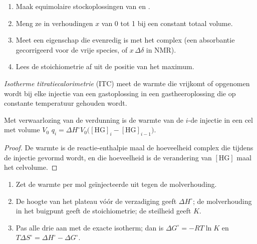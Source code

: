 \begin{method}\label{met:b3:supramolecular:job}
\begin{enumerate}
  \item Maak equimolaire stockoplossingen van  en .
  \item Meng ze in verhoudingen $x$ van 0 tot 1 bij een constant totaal volume.
  \item Meet een eigenschap die evenredig is met het complex (een
        absorbantie gecorrigeerd voor de vrije species, of $x\,\Delta\delta$ in NMR).
  \item Lees de stoichiometrie af uit de positie van het maximum.
\end{enumerate}
\end{method}

\begin{definition}\label{def:b3:supramolecular:itc}
\emph{Isotherme titratiecalorimetrie}
(ITC) meet de warmte die vrijkomt of opgenomen wordt bij elke injectie van
een gastoplossing in een gastheeroplossing die op constante temperatuur
gehouden wordt.
\end{definition}

\begin{proposition}\label{prop:b3:supramolecular:itc}
Met verwaarlozing van de verdunning is de warmte van de $i$-de injectie in een cel met volume $V_0$
$q_i = \Delta H^\circ V_0\bigl([\mathrm{HG}]_i - [\mathrm{HG}]_{i-1}\bigr)$.
\end{proposition}

\begin{proof}
De warmte is de reactie-enthalpie maal de hoeveelheid complex die tijdens
de injectie gevormd wordt, en die hoeveelheid is de verandering van $[\mathrm{HG}]$ maal het celvolume.
\end{proof}

\begin{method}\label{met:b3:supramolecular:itc}
\begin{enumerate}
  \item Zet de warmte per mol geïnjecteerde  uit tegen de
        molverhouding.
  \item De hoogte van het plateau vóór de verzadiging geeft $\Delta H^\circ$; de molverhouding in
        het buigpunt geeft de stoichiometrie; de steilheid geeft $K$.
  \item Pas alle drie aan met de exacte isotherm; dan is $\Delta G^\circ = -RT\ln K$ en
        $T\Delta S^\circ = \Delta H^\circ - \Delta G^\circ$.
\end{enumerate}
\end{method}

